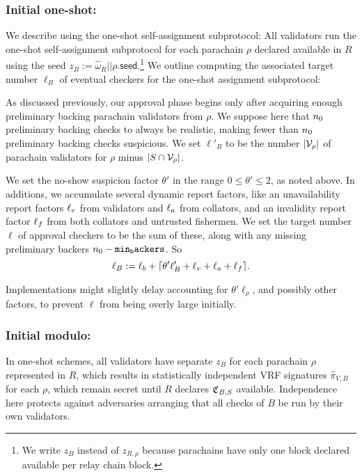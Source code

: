\subsubsection{Initial one-shot:}

We describe using the one-shot self-assignment subprotocol:  All validators run the one-shot self-assignment subprotocol for each parachain $\rho$ declared available in $R$ using the seed $z_B := \hat{\omega}_R || \rho.\mathsf{seed}$.\footnote{We write $z_B$ instead of $z_{R,\rho}$ because parachains have only one block declared available per relay chain block.}  We outline computing the associated target number $\ell_B$ of eventual checkers for the one-shot assignment subprotocol: 

As discussed previously, our approval phase begins only after acquiring enough preliminary backing parachain validators from $\rho$.  We suppose here that $n_0$ preliminary backing checks to always be realistic, making fewer than $n_0$ preliminary backing checks suspicious.  We set $\ell'_B$ to be the number $|\mathcal{V}_\rho|$ of parachain validators for $\rho$ minus $|S \cap \mathcal{V}_\rho|$. 

We set the no-show suspicion factor $\theta'$ in the range $0 \le \theta' \le 2$, as noted above.
In additions, we accumulate several dynamic report factors, like an unavailability report factors $\ell_v$ from validators and $\ell_a$ from collators, and an invalidity report factor $\ell_f$ from both collators and untrusted fishermen.  We set the target number $\ell$ of approval checkers to be the sum of these, along with any missing preliminary backers $n_0-\mathtt{min_backers}$.  So
$$ \ell_B := \ell_b + \lceil \theta' \ell'_B + \ell_v + \ell_a + \ell_f \rceil . $$

Implementations might slightly delay accounting for $\theta' \ell_\rho$, and possibly other factors, to prevent $\ell$ from being overly large initially. 

\subsubsection{Initial modulo:}

In one-shot schemes, all validators have separate $z_B$ for each parachain $\rho$ represented in $R$, which results in statistically independent VRF signatures $\hat{\pi}_{V,B}$ for each $\rho$, which remain secret until $R$ declares $\mathfrak{C}_{B,S}$ available.  
Independence here protects against adversaries arranging that all checks of $B$ be run by their own validators.  


